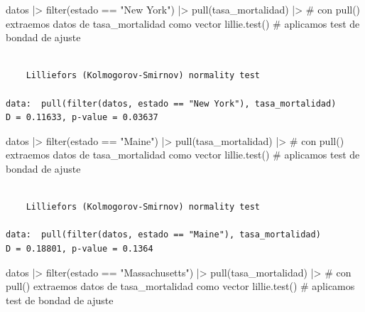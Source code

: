 \documentclass[
  spanish,
  a4paper,
]{scrbook}
\newenvironment{Shaded}{\begin{snugshade}}{\end{snugshade}}
\newcommand{\CommentTok}[1]{\textcolor[rgb]{0.37,0.37,0.37}{#1}}
\newcommand{\FunctionTok}[1]{\textcolor[rgb]{0.28,0.35,0.67}{#1}}
\newcommand{\NormalTok}[1]{\textcolor[rgb]{0.00,0.23,0.31}{#1}}
\newcommand{\SpecialCharTok}[1]{\textcolor[rgb]{0.37,0.37,0.37}{#1}}
\newcommand{\StringTok}[1]{\textcolor[rgb]{0.13,0.47,0.30}{#1}}
\begin{document}
\begin{Shaded}
\begin{Highlighting}[]
\NormalTok{datos }\SpecialCharTok{|\textgreater{}}
  \FunctionTok{filter}\NormalTok{(estado }\SpecialCharTok{==} \StringTok{"New York"}\NormalTok{) }\SpecialCharTok{|\textgreater{}}
  \FunctionTok{pull}\NormalTok{(tasa\_mortalidad) }\SpecialCharTok{|\textgreater{}} \CommentTok{\# con pull() extraemos datos de tasa\_mortalidad como vector}
  \FunctionTok{lillie.test}\NormalTok{() }\CommentTok{\# aplicamos test de bondad de ajuste}
\end{Highlighting}
\end{Shaded}

\begin{verbatim}

    Lilliefors (Kolmogorov-Smirnov) normality test

data:  pull(filter(datos, estado == "New York"), tasa_mortalidad)
D = 0.11633, p-value = 0.03637
\end{verbatim}

\begin{Shaded}
\begin{Highlighting}[]
\NormalTok{datos }\SpecialCharTok{|\textgreater{}}
  \FunctionTok{filter}\NormalTok{(estado }\SpecialCharTok{==} \StringTok{"Maine"}\NormalTok{) }\SpecialCharTok{|\textgreater{}}
  \FunctionTok{pull}\NormalTok{(tasa\_mortalidad) }\SpecialCharTok{|\textgreater{}} \CommentTok{\# con pull() extraemos datos de tasa\_mortalidad como vector}
  \FunctionTok{lillie.test}\NormalTok{() }\CommentTok{\# aplicamos test de bondad de ajuste}
\end{Highlighting}
\end{Shaded}

\begin{verbatim}

    Lilliefors (Kolmogorov-Smirnov) normality test

data:  pull(filter(datos, estado == "Maine"), tasa_mortalidad)
D = 0.18801, p-value = 0.1364
\end{verbatim}

\begin{Shaded}
\begin{Highlighting}[]
\NormalTok{datos }\SpecialCharTok{|\textgreater{}}
  \FunctionTok{filter}\NormalTok{(estado }\SpecialCharTok{==} \StringTok{"Massachusetts"}\NormalTok{) }\SpecialCharTok{|\textgreater{}}
  \FunctionTok{pull}\NormalTok{(tasa\_mortalidad) }\SpecialCharTok{|\textgreater{}} \CommentTok{\# con pull() extraemos datos de tasa\_mortalidad como vector}
  \FunctionTok{lillie.test}\NormalTok{() }\CommentTok{\# aplicamos test de bondad de ajuste}
\end{Highlighting}
\end{Shaded}
\end{document}
